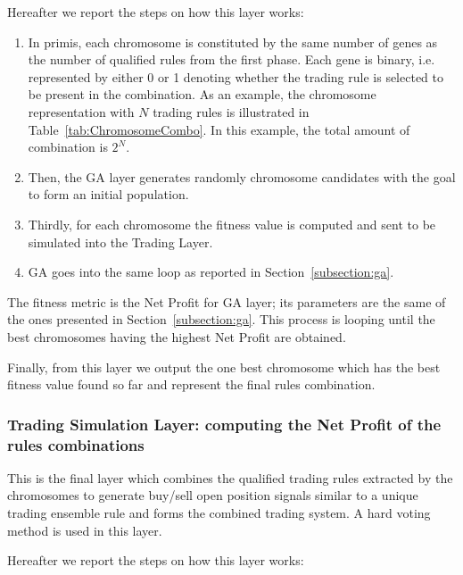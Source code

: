 \noindent Hereafter we report the steps on how this layer works:

\begin{enumerate}
\setlength\itemsep{0.3em}
\item In primis, each chromosome is constituted by the same number of genes as the number of qualified rules from the first phase. Each gene is binary, i.e. represented by either 0 or 1 denoting whether the trading rule is selected to be present in the combination. As an example, the chromosome representation with $N$ trading rules is illustrated in Table~\ref{tab:ChromosomeCombo}. In this example, the total amount of combination is $2^N$.
\item Then, the GA layer generates randomly chromosome candidates with the goal to form an initial population.
\item Thirdly, for each chromosome the fitness value is computed and sent to be simulated into the Trading Layer.
\item GA goes into the same loop as reported in Section~\ref{subsection:ga}.
\end{enumerate}

The fitness metric is the Net Profit for GA layer; its parameters are the same of the ones presented in Section~\ref{subsection:ga}. This process is looping until the best chromosomes having the highest Net Profit are obtained. 

Finally, from this layer we output the one best chromosome which has the best fitness value found so far and represent the final rules combination.

\subsubsection{Trading Simulation Layer: computing the Net Profit of the rules combinations}
\label{subsection:trading2}

This is the final layer which combines the qualified trading rules extracted by the chromosomes to generate buy/sell open position signals similar to a unique trading ensemble rule and forms the combined trading system. A hard voting method is used in this layer.

\noindent Hereafter we report the steps on how this layer works:

